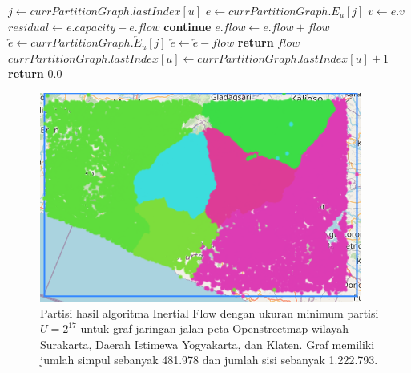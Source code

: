 \begin{algorithm}
{\begin{minipage}{\textwidth}
\begin{algorithmic}[1]
        \State $j \gets currPartitionGraph.lastIndex[u]  $
        \State $e \gets  currPartitionGraph.E_u[j] $
        \State $v \gets e.v$
        \State $residual \gets e.capacity - e.flow$
            \State \textbf{continue}
        \EndIf 
            \State $e.flow \gets e.flow + flow$
            \State $\overleftarrow{e} \gets currPartitionGraph.\overleftarrow{E}_u[j] $
            \State $\overleftarrow{e} \gets \overleftarrow{e} -flow$
            \State \textbf{return} $flow$
        \EndIf
        \State $currPartitionGraph.lastIndex[u]  \gets currPartitionGraph.lastIndex[u]  +1 $
    \EndWhile
    \State \textbf{return } $0.0$
\EndProcedure
\end{algorithmic}
\end{minipage}%
}
\end{algorithm}



\begin{figure}[H]
    \centering
    \includegraphics[]{figures/partition_level_4.png}
    \caption{Partisi hasil algoritma Inertial Flow dengan ukuran minimum partisi $U=2^{17}$ untuk graf jaringan jalan peta Openstreetmap wilayah Surakarta, Daerah Istimewa Yogyakarta, dan Klaten. Graf memiliki jumlah simpul sebanyak 481.978 dan jumlah sisi sebanyak 1.222.793.}
    \label{fig:inertial-flow}
\end{figure}
